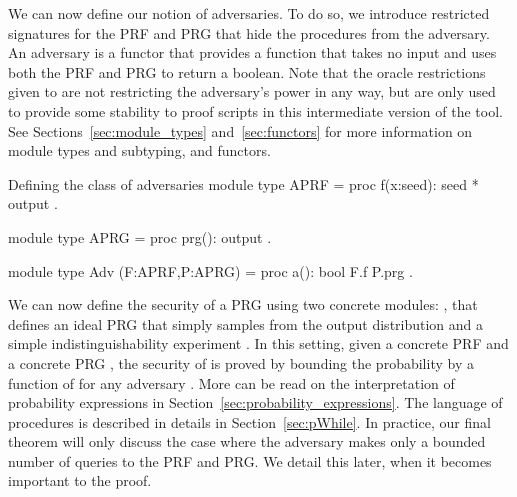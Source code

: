We can now define our notion of adversaries. To do so, we introduce restricted
signatures for the PRF and PRG that hide the  procedures from the
adversary. An adversary is a functor that provides a function  that takes
no input and uses both the PRF and PRG to return a boolean. Note that the oracle
restrictions given to  are not restricting the adversary's power in any way,
but are only used to provide some stability to proof scripts in this
intermediate version of the tool. See Sections~\ref{sec:module_types}
and~\ref{sec:functors} for more information on module types and subtyping, and
functors.

\begin{easycrypt}[style=easycrypt-pretty]{Defining the class of adversaries}
module type APRF = {
  proc f(x:seed): seed * output
}.

module type APRG = {
  proc prg(): output
}.

module type Adv (F:APRF,P:APRG) = {
  proc a(): bool {F.f P.prg}
}.
\end{easycrypt}

We can now define the security of a PRG using two concrete modules: ,
that defines an ideal PRG that simply samples from the output distribution
 and a simple indistinguishability experiment . In this
setting, given a concrete PRF  and a concrete PRG , the security
of  is proved by bounding the probability
 by a function of
 for any adversary . More can be read on
the interpretation of probability expressions in
Section~\ref{sec:probability_expressions}. The language of procedures is
described in details in Section~\ref{sec:pWhile}.
In practice, our final theorem will only discuss the case where the adversary
makes only a bounded number of queries to the PRF and PRG. We detail this later,
when it becomes important to the proof.


